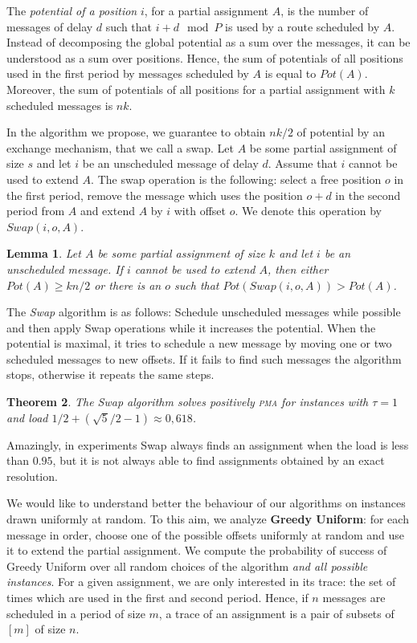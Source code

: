 \documentclass[10pt, conference, letterpaper]{algotel}
\newtheorem{theorem}{Theorem}
\newtheorem{lemma}[theorem]{Lemma}
\newcommand\pma{\textsc{pma}\xspace}
\begin{document}
The \emph{potential of a position} $i$, for a partial assignment $A$, is the number of messages of delay $d$ such that $i+d \mod P$ is used by a route scheduled by $A$. 
Instead of decomposing the global potential as a sum over the messages, it can be understood
as a sum over positions. Hence, the sum of potentials of all positions used in the first period by messages scheduled by $A$ is equal to $Pot(A)$.  Moreover, the sum of potentials of all positions for a partial assignment with $k$ scheduled messages is $nk$.  

In the algorithm we propose, we guarantee to obtain $nk/2$ of potential by an exchange mechanism, that we call a swap. Let $A$ be some partial assignment of size $s$ and let $i$ be an unscheduled message of delay $d$. Assume that $i$ cannot be used to extend $A$. The swap operation is the following: select a free position $o$ in the first period, remove the message which uses the position $o+d$ in the second period from $A$ and extend $A$ by $i$ with offset $o$. We denote this operation by $Swap(i,o,A)$.

\begin{lemma}\label{lemma:swap}
Let $A$ be some partial assignment of size $k$ and let $i$ be an unscheduled message. If $i$ cannot be used to extend $A$, then either $Pot(A) \geq kn/2$ or there is an $o$ such that $Pot(Swap(i,o,A)) > Pot(A)$.
\end{lemma}

The \emph{Swap} algorithm is as follows: Schedule unscheduled messages while possible and then apply Swap operations while it increases the potential. When the potential is maximal, it tries to schedule a new message by moving one or two scheduled messages to new offsets. If it fails to find such messages the algorithm stops, otherwise it repeats the same steps. 

\begin{theorem}
The Swap algorithm solves positively \pma for instances with $\tau =1$ and load $1/2 + (\sqrt{5}/2 -1) \approx 0,618$.
\end{theorem}

Amazingly, in experiments Swap always finds an assignment when the load is less than $0.95$, but it is not always able to find assignments obtained by an exact resolution. 

We would like to understand better the behaviour of our algorithms
on instances drawn uniformly at random. To this aim, we analyze \textbf{Greedy Uniform}: for each message in order, choose one of the possible offsets uniformly at random and use it to extend the partial assignment. We compute the probability of success of Greedy Uniform over all random choices of the algorithm \emph{and all possible instances}. For a given assignment, we are only interested in its trace: the set of times which are used in the first and second period. Hence, if $n$ messages are scheduled in a period of size $m$, a trace of an assignment is a pair of subsets of $[m]$ of size $n$.
\end{document}
